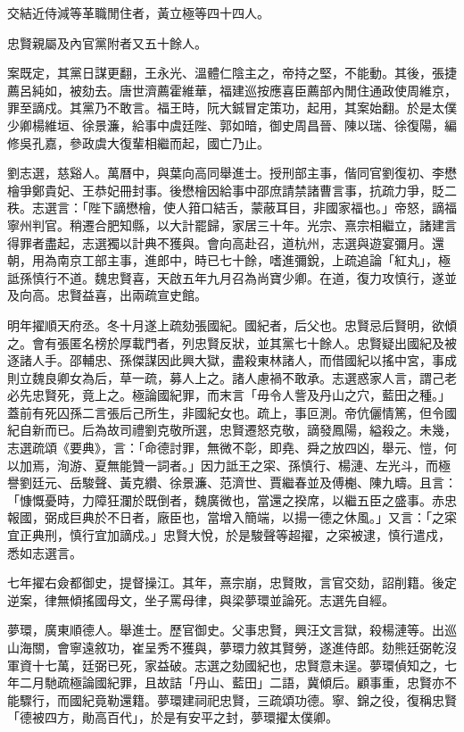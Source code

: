 \begin{pinyinscope}
交結近侍減等革職閒住者，黃立極等四十四人。

忠賢親屬及內官黨附者又五十餘人。

案既定，其黨日謀更翻，王永光、溫體仁陰主之，帝持之堅，不能動。其後，張捷薦呂純如，被劾去。唐世濟薦霍維華，福建巡按應喜臣薦部內閒住通政使周維京，罪至謫戍。其黨乃不敢言。福王時，阮大鋮冒定策功，起用，其案始翻。於是太僕少卿楊維垣、徐景濂，給事中虞廷陛、郭如暗，御史周昌晉、陳以瑞、徐復陽，編修吳孔嘉，參政虞大復輩相繼而起，國亡乃止。

劉志選，慈谿人。萬曆中，與葉向高同舉進士。授刑部主事，偕同官劉復初、李懋檜爭鄭貴妃、王恭妃冊封事。後懋檜因給事中邵庶請禁諸曹言事，抗疏力爭，貶二秩。志選言：「陛下謫懋檜，使人箝口結舌，蒙蔽耳目，非國家福也。」帝怒，謫福寧州判官。稍遷合肥知縣，以大計罷歸，家居三十年。光宗、熹宗相繼立，諸建言得罪者盡起，志選獨以計典不獲與。會向高赴召，道杭州，志選與遊宴彌月。還朝，用為南京工部主事，進郎中，時已七十餘，嗜進彌銳，上疏追論「紅丸」，極詆孫慎行不道。魏忠賢喜，天啟五年九月召為尚寶少卿。在道，復力攻慎行，遂並及向高。忠賢益喜，出兩疏宣史館。

明年擢順天府丞。冬十月遂上疏劾張國紀。國紀者，后父也。忠賢忌后賢明，欲傾之。會有張匿名榜於厚載門者，列忠賢反狀，並其黨七十餘人。忠賢疑出國紀及被逐諸人手。邵輔忠、孫傑謀因此興大獄，盡殺東林諸人，而借國紀以搖中宮，事成則立魏良卿女為后，草一疏，募人上之。諸人慮禍不敢承。志選惑家人言，謂己老必先忠賢死，竟上之。極論國紀罪，而末言「毋令人訾及丹山之穴，藍田之種。」蓋前有死囚孫二言張后己所生，非國紀女也。疏上，事叵測。帝伉儷情篤，但令國紀自新而已。后為故司禮劉克敬所選，忠賢遷怒克敬，謫發鳳陽，縊殺之。未幾，志選疏頌《要典》，言：「命德討罪，無微不彰，即堯、舜之放四凶，舉元、愷，何以加焉，洵游、夏無能贊一詞者。」因力詆王之寀、孫慎行、楊漣、左光斗，而極譽劉廷元、岳駿聲、黃克纘、徐景濂、范濟世、賈繼春並及傅櫆、陳九疇。且言：「慷慨憂時，力障狂瀾於既倒者，魏廣微也，當還之揆席，以繼五臣之盛事。赤忠報國，弼成巨典於不日者，廠臣也，當增入簡端，以揚一德之休風。」又言：「之寀宜正典刑，慎行宜加謫戍。」忠賢大悅，於是駿聲等超擢，之寀被逮，慎行遣戍，悉如志選言。

七年擢右僉都御史，提督操江。其年，熹宗崩，忠賢敗，言官交劾，詔削籍。後定逆案，律無傾搖國母文，坐子罵母律，與梁夢環並論死。志選先自經。

夢環，廣東順德人。舉進士。歷官御史。父事忠賢，興汪文言獄，殺楊漣等。出巡山海關，會寧遠敘功，崔呈秀不獲與，夢環力敘其賢勞，遂進侍郎。劾熊廷弼乾沒軍資十七萬，廷弼已死，家益破。志選之劾國紀也，忠賢意未逞。夢環偵知之，七年二月馳疏極論國紀罪，且故詰「丹山、藍田」二語，冀傾后。顧事重，忠賢亦不能驟行，而國紀竟勒還籍。夢環建祠祀忠賢，三疏頌功德。寧、錦之役，復稱忠賢「德被四方，勛高百代」，於是有安平之封，夢環擢太僕卿。


\end{pinyinscope}
